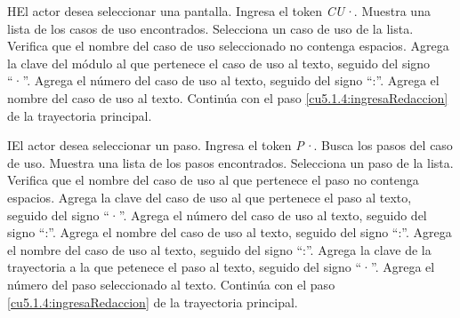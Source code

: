  \begin{UCtrayectoriaA}{H}{El actor desea seleccionar una pantalla.}
 	\UCpaso[\UCactor] Ingresa el token {\it CU·}.
  	\UCpaso[\UCsist] Muestra una lista de los casos de uso encontrados.
 	\UCpaso[\UCactor] Selecciona un caso de uso de la lista.
  	\UCpaso[\UCsist] Verifica que el nombre del caso de uso seleccionado no contenga espacios. 
  	\UCpaso[\UCsist] Agrega la clave del módulo al que pertenece el caso de uso al texto, seguido del signo ``·''.
  	\UCpaso[\UCsist] Agrega el número del caso de uso al texto, seguido del signo ``:''.
  	\UCpaso[\UCsist] Agrega el nombre del caso de uso al texto.
    \UCpaso[] Continúa con el paso \ref{cu5.1.4:ingresaRedaccion} de la trayectoria principal.
 \end{UCtrayectoriaA}
 \begin{UCtrayectoriaA}{I}{El actor desea seleccionar un paso.}
 	\UCpaso[\UCactor] Ingresa el token {\it P·}.
	\UCpaso[\UCsist] Busca los pasos del caso de uso.
  	\UCpaso[\UCsist] Muestra una lista de los pasos encontrados.
 	\UCpaso[\UCactor] Selecciona un paso de la lista.
  	\UCpaso[\UCsist] Verifica que el nombre del caso de uso al que pertenece el paso no contenga espacios. 
  	\UCpaso[\UCsist] Agrega la clave del caso de uso al que pertenece el paso al texto, seguido del signo ``·''.
  	\UCpaso[\UCsist] Agrega el número del caso de uso al texto, seguido del signo ``:''.
  	\UCpaso[\UCsist] Agrega el nombre del caso de uso al texto, seguido del signo ``:''.
  	\UCpaso[\UCsist] Agrega el nombre del caso de uso al texto, seguido del signo ``:''.
  	\UCpaso[\UCsist] Agrega la clave de la trayectoria a la que petenece el paso al texto, seguido del signo ``·''.
  	\UCpaso[\UCsist] Agrega el número del paso seleccionado al texto.
    \UCpaso[] Continúa con el paso \ref{cu5.1.4:ingresaRedaccion} de la trayectoria principal.
 \end{UCtrayectoriaA}
